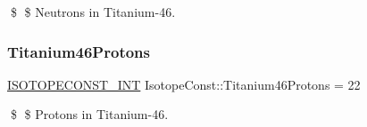 \$ \$ Neutrons in Titanium-\/46. \mbox{\label{group___isotope_const-_titanium-_ti46_gac0704505afbf387cf3bc5cd6591d80b3}} 
\subsubsection{\texorpdfstring{Titanium46\+Protons}{Titanium46Protons}}
{\footnotesize\ttfamily \mbox{\hyperlink{group___isotope_const-_macros_ga5f18360b3e99483a35c32d789e62621c}{I\+S\+O\+T\+O\+P\+E\+C\+O\+N\+S\+T\+\_\+\+I\+NT}} Isotope\+Const\+::\+Titanium46\+Protons = 22}

\$ \$ Protons in Titanium-\/46. 